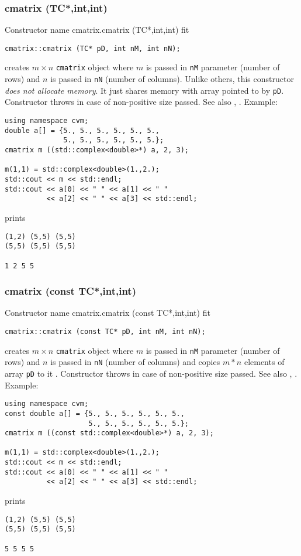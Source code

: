 \subsubsection{cmatrix (TC*,int,int)}
Constructor%
\pdfdest name {cmatrix.cmatrix (TC*,int,int)} fit
\begin{verbatim}
cmatrix::cmatrix (TC* pD, int nM, int nN);
\end{verbatim}
creates  $m\times n$ \verb"cmatrix" object where $m$ is passed in
\verb"nM" parameter (number of rows) and $n$ is passed in
\verb"nN" (number of columns).
Unlike others, this constructor \textit{does not allocate memory}.
It just shares  memory with  array pointed to by \verb"pD".
Constructor throws  
in case of non-positive size passed.
See also , .
Example:
\begin{Verbatim}
using namespace cvm;
double a[] = {5., 5., 5., 5., 5., 5.,
              5., 5., 5., 5., 5., 5.};
cmatrix m ((std::complex<double>*) a, 2, 3);

m(1,1) = std::complex<double>(1.,2.);
std::cout << m << std::endl;
std::cout << a[0] << " " << a[1] << " "
          << a[2] << " " << a[3] << std::endl;
\end{Verbatim}
prints
\begin{Verbatim}
(1,2) (5,5) (5,5)
(5,5) (5,5) (5,5)

1 2 5 5
\end{Verbatim}
\newpage



\subsubsection{cmatrix (const TC*,int,int)}
Constructor%
\pdfdest name {cmatrix.cmatrix (const TC*,int,int)} fit
\begin{verbatim}
cmatrix::cmatrix (const TC* pD, int nM, int nN);
\end{verbatim}
creates  $m\times n$ \verb"cmatrix" object where $m$ is passed in
\verb"nM" parameter (number of rows) and $n$ is passed in
\verb"nN" (number of columns)
and copies $m*n$ elements of  array \verb"pD" to it .
Constructor throws  
in case of non-positive size passed.
See also , .
Example:
\begin{Verbatim}
using namespace cvm;
const double a[] = {5., 5., 5., 5., 5., 5.,
                    5., 5., 5., 5., 5., 5.};
cmatrix m ((const std::complex<double>*) a, 2, 3);

m(1,1) = std::complex<double>(1.,2.);
std::cout << m << std::endl;
std::cout << a[0] << " " << a[1] << " "
          << a[2] << " " << a[3] << std::endl;
\end{Verbatim}
prints
\begin{Verbatim}
(1,2) (5,5) (5,5)
(5,5) (5,5) (5,5)

5 5 5 5
\end{Verbatim}
\newpage



